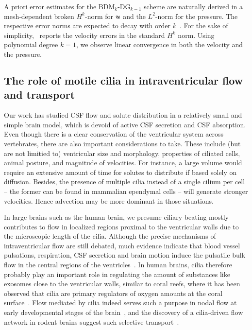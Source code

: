 \documentclass{WileyMSP-template}
\begin{document}
A priori error estimates for the $\mathrm{BDM}_k$-$\mathrm{DG}_{k-1}$ scheme are naturally 
derived in a mesh-dependent broken $H^k$-norm for $\bm{u}$ and the $L^2$-norm for the pressure.
The respective error norms are expected to decay with order $k$~\cite{Cockburn2005AEquations}.
For the sake of simplicity,~
reports the velocity errors in the standard $H^k$ norm. Using polynomial degree  
$k=1$, we observe linear convergence in both the velocity and the pressure.   

\subsection{The role of motile cilia in intraventricular flow and transport}
Our work has studied CSF flow and solute distribution
in a relatively small and simple brain model, which is devoid of
active CSF secretion and CSF absorption. Even though there is
a clear conservation of the ventricular system across vertebrates,
there are also important considerations to take. These include (but are not limitied to)
ventricular size and morphology, properties of ciliated cells,
animal posture, and magnitude of velocities. For instance, a large
volume would require an extensive amount of time for solutes to distribute
if based solely on diffusion. Besides, the presence of multiple cilia
instead of a single cilium per cell -- the former can be found in
mammalian ependymal cells -- will generate stronger velocities.
Hence advection may be more dominant in those situations.

In large brains such as the human brain, we presume ciliary beating mostly 
contributes to flow in localized regions proximal to the ventricular walls due to
the microscopic length of the cilia.
Although the precise mechanisms of intraventricular flow are still debated,
much evidence indicate that blood vessel pulsations, respiration, CSF secretion
and brain motion induce the pulsatile bulk flow in the central
regions of the ventricles~\cite{Vinje2019RespiratoryMeasurements,
Siyahhan2014FlowVentricles, Linninger2005PulsatileBrain, Enzmann1992BrainImaging,
Kurtcuoglu2007ComputationalSylvius}.
In human brains, cilia therefore probably play an important role in regulating the
amount of substances like exosomes close to the ventricular walls, similar to coral
reefs, where it has been observed that cilia are primary regulators of
oxygen amounts at the coral surface~\cite{Pacherres2022CiliaryProduction}.
Flow mediated by cilia indeed serves such a purpose in nodal flow at early
developmental stages of the brain~\cite{Hirokawa2006NodalAsymmetry}, and the discovery
of a cilia-driven flow network in rodent brains suggest such selective
transport~\cite{Faubel2016Cilia-basedVentricles}.
\end{document}
